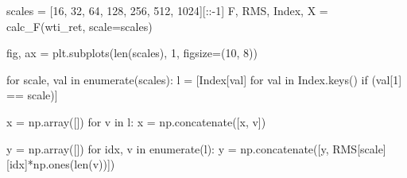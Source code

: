 \documentclass[
  letterpaper,
]{report}
\newenvironment{Shaded}{\begin{snugshade}}{\end{snugshade}}
\newcommand{\BuiltInTok}[1]{\textcolor[rgb]{0.00,0.23,0.31}{#1}}
\newcommand{\ControlFlowTok}[1]{\textcolor[rgb]{0.00,0.23,0.31}{#1}}
\newcommand{\DecValTok}[1]{\textcolor[rgb]{0.68,0.00,0.00}{#1}}
\newcommand{\KeywordTok}[1]{\textcolor[rgb]{0.00,0.23,0.31}{#1}}
\newcommand{\NormalTok}[1]{\textcolor[rgb]{0.00,0.23,0.31}{#1}}
\newcommand{\OperatorTok}[1]{\textcolor[rgb]{0.37,0.37,0.37}{#1}}
\begin{document}
\begin{Shaded}
\begin{Highlighting}[]
\NormalTok{scales }\OperatorTok{=}\NormalTok{ [}\DecValTok{16}\NormalTok{, }\DecValTok{32}\NormalTok{, }\DecValTok{64}\NormalTok{, }\DecValTok{128}\NormalTok{, }\DecValTok{256}\NormalTok{, }\DecValTok{512}\NormalTok{, }\DecValTok{1024}\NormalTok{][::}\OperatorTok{{-}}\DecValTok{1}\NormalTok{]}
\NormalTok{F, RMS, Index, X }\OperatorTok{=}\NormalTok{ calc\_F(wti\_ret, scale}\OperatorTok{=}\NormalTok{scales)}

\NormalTok{fig, ax }\OperatorTok{=}\NormalTok{ plt.subplots(}\BuiltInTok{len}\NormalTok{(scales), }\DecValTok{1}\NormalTok{, figsize}\OperatorTok{=}\NormalTok{(}\DecValTok{10}\NormalTok{, }\DecValTok{8}\NormalTok{))}

\ControlFlowTok{for}\NormalTok{ scale, val }\KeywordTok{in} \BuiltInTok{enumerate}\NormalTok{(scales):}
\NormalTok{    l }\OperatorTok{=}\NormalTok{ [Index[val] }\ControlFlowTok{for}\NormalTok{ val }\KeywordTok{in}\NormalTok{ Index.keys() }\ControlFlowTok{if}\NormalTok{ (val[}\DecValTok{1}\NormalTok{] }\OperatorTok{==}\NormalTok{ scale)]}

\NormalTok{    x }\OperatorTok{=}\NormalTok{ np.array([])}
    \ControlFlowTok{for}\NormalTok{ v }\KeywordTok{in}\NormalTok{ l:}
\NormalTok{        x }\OperatorTok{=}\NormalTok{ np.concatenate([x, v])}

\NormalTok{    y }\OperatorTok{=}\NormalTok{ np.array([])}
    \ControlFlowTok{for}\NormalTok{ idx, v }\KeywordTok{in} \BuiltInTok{enumerate}\NormalTok{(l): }
\NormalTok{        y }\OperatorTok{=}\NormalTok{ np.concatenate([y, RMS[scale][idx]}\OperatorTok{*}\NormalTok{np.ones(}\BuiltInTok{len}\NormalTok{(v))])}


\end{Highlighting}
\end{Shaded}
\end{document}
